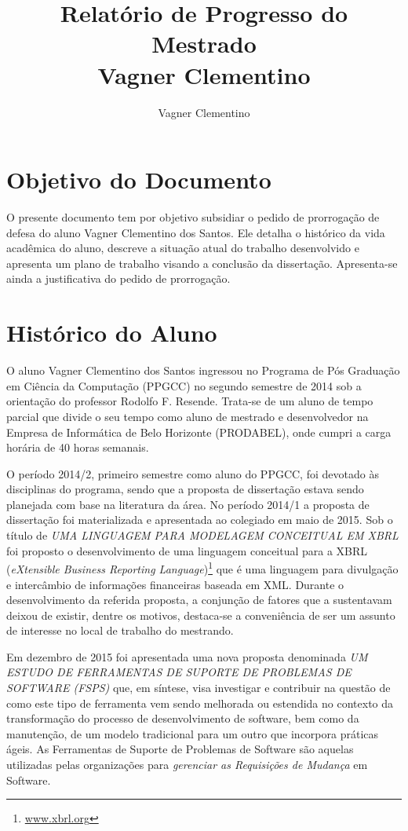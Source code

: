 \documentclass[10pt,a4paper]{report}
\author{Vagner Clementino}
\title{Relatório de Progresso do Mestrado\\
	Vagner Clementino}
\begin{document}
\maketitle

	
\section{Objetivo do Documento}
\label{sec:objetivo}

O presente documento tem por objetivo subsidiar o pedido de prorrogação de defesa do aluno Vagner Clementino dos Santos. Ele detalha o histórico da vida acadêmica do aluno, descreve a situação atual do trabalho desenvolvido e apresenta um plano de trabalho visando a conclusão da dissertação.  Apresenta-se ainda a justificativa do pedido de prorrogação.

\section{Histórico do Aluno}
\label{sec:historico}

O aluno Vagner Clementino dos Santos ingressou no Programa de Pós Graduação em Ciência da Computação (PPGCC) no segundo semestre de 2014 sob a orientação do professor Rodolfo F. Resende. Trata-se de um aluno de tempo parcial que divide o seu tempo como aluno de mestrado e desenvolvedor na Empresa de Informática de Belo Horizonte (PRODABEL), onde cumpri a carga horária de 40 horas semanais. 

O período 2014/2, primeiro semestre como aluno do PPGCC, foi devotado às disciplinas do programa, sendo que a proposta de dissertação estava sendo planejada com base na literatura da área. No período 2014/1 a proposta de dissertação foi materializada e apresentada ao colegiado em maio de 2015. Sob o título de \textit{UMA LINGUAGEM PARA MODELAGEM CONCEITUAL EM XBRL} foi proposto o desenvolvimento de uma linguagem conceitual para a XBRL (\textit{eXtensible Business Reporting Language})\footnote{\url{www.xbrl.org}} que é uma linguagem para divulgação e intercâmbio de informações financeiras baseada em XML. Durante o desenvolvimento da referida proposta, a conjunção de fatores que a sustentavam deixou de existir, dentre os motivos, destaca-se a conveniência de ser um assunto de interesse no local de trabalho do mestrando.

Em dezembro de 2015 foi apresentada uma nova proposta denominada  \textit{UM ESTUDO DE FERRAMENTAS DE SUPORTE DE PROBLEMAS DE SOFTWARE (FSPS)} que, em síntese, visa investigar e contribuir na questão de como este tipo de ferramenta vem sendo melhorada ou estendida no contexto da transformação do processo de desenvolvimento de software, bem como da manutenção, de um modelo tradicional para um outro que incorpora práticas ágeis. As Ferramentas de Suporte de Problemas de Software são aquelas utilizadas pelas organizações para \textit{gerenciar as Requisições de Mudança}\cite{1703974} em Software. 
\end{document}
